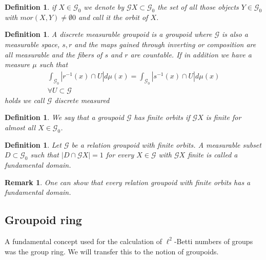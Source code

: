 \documentclass[12pt,a4paper]{scrartcl}
\newtheorem{Definition}[Theorem]{Definition}
\newtheorem{Remark}[Theorem]{Remark}
\numberwithin{equation}{section}
\newcommand{\2}{\mathbb{Z} / 2 \mathbb{Z}}
\newcommand{\G}{\mathcal{G}}
\newcommand{\1}{\bar{1}}
\newcommand{\0}{\bar{0}}
\begin{document}
\begin{Definition}
	if $X \in \G_0$ we denote by $\G X \subset \G_0$ the set of all those objects $Y \in \G_0$ with $mor(X, Y) \neq \emptyset0$ and call it the orbit of $X$.
\end{Definition}
\begin{Definition}
	A discrete measurable groupoid is a groupoid where $\mathcal{G}$ is also a measurable space, $s, r$ and the maps gained through inverting or composition are all measurable and the fibers of $s$ and $r$ are countable.
	If in addition we have a measure $\mu$ such that 
	\begin{align*}
		\int_{\mathcal{G}_0} |r^{-1}(x) \cap U| d\mu(x) = \int_{\mathcal{G}_0} |s^{-1}(x) \cap U| d\mu(x) \\ \forall U \subset \mathcal{G}
	\end{align*}
	holds we call $\mathcal{G}$ discrete measured
\end{Definition}
\begin{Definition}
	We say that a groupoid $\G$ has finite orbits if $\G X$ is finite for almost all $X \in \G_0$.
\end{Definition}
\begin{Definition}
	Let $\G$ be a relation groupoid with finite orbits. A measurable subset $D \subset \G_0$ such that $|D \cap \G X| = 1$ for every $X \in \G$ with $\G X$ finite is called a fundamental domain.
\end{Definition}
\begin{Remark}
	One can show that every relation groupoid with finite orbits has a fundamental domain.
\end{Remark}

\subsection{Groupoid ring}
A fundamental concept used for the calculation of $\ell^2$-Betti numbers of groups was the group ring. We will transfer this to the notion of groupoids.
\end{document}

